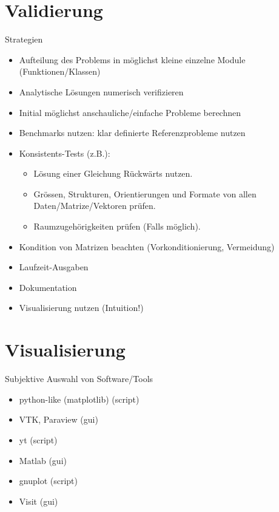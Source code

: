 \documentclass[hyperref={xetex}]{beamer}
\begin{document}
\section*{Validierung}
\begin{frame}{Strategien}
  \begin{itemize}
    \item Aufteilung des Problems in möglichst kleine einzelne Module (Funktionen/Klassen) 
    \item Analytische Lösungen numerisch verifizieren
    \item Initial möglichst anschauliche/einfache Probleme berechnen
    \item Benchmarks nutzen: klar definierte Referenzprobleme nutzen
    \item Konsistents-Tests (z.B.):
      \begin{itemize}
        \item  Lösung einer Gleichung Rückwärts nutzen. 
        \item Grössen, Strukturen, Orientierungen und Formate von allen Daten/Matrize/Vektoren prüfen.
        \item Raumzugehörigkeiten prüfen (Falls möglich).
      \end{itemize}
    \item Kondition von Matrizen beachten (Vorkonditionierung, Vermeidung)
    \item Laufzeit-Ausgaben
    \item Dokumentation
    \item Visualisierung nutzen (Intuition!)
  \end{itemize}
\end{frame}


\section*{Visualisierung}

\begin{frame}{Subjektive Auswahl von Software/Tools}
  \begin{itemize}
    \item python-like (matplotlib) (script)
    \item VTK, Paraview (gui)
 \item yt (script)
 \item Matlab (gui)
 \item gnuplot (script) 
 \item Visit (gui)
  \end{itemize}
  
\end{frame}
\end{document}

